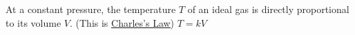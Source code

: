 {At a constant pressure, the temperature $T$ of an ideal gas is directly proportional to its volume $V$.  (This is \href{http://en.wikipedia.org/wiki/Charles's_law}{\underline{Charles's Law}}) }
{$T = k V$}
